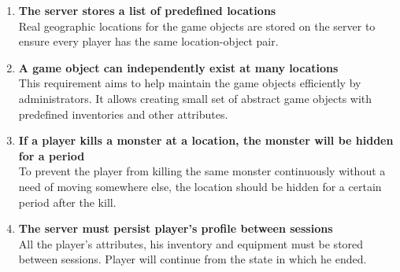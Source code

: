 \begin{enumerate}
			\item \textbf{The server stores a list of predefined locations} \\	
			Real geographic locations for the game objects are stored on the server to ensure every player has the same location-object pair. 
								
			\item \textbf{A game object can independently exist at many locations} \\
			This requirement aims to help maintain the game objects efficiently by administrators. It allows creating small set of abstract game objects with predefined inventories and other attributes. 
			
			\item \textbf{If a player kills a monster at a location, the monster will be hidden for a period} \\
			To prevent the player from killing the same monster continuously without a need of moving somewhere else, the location should be hidden for a certain period after the kill.						
					
			\item \textbf{The server must persist player’s profile between sessions} \\
			All the player's attributes, his inventory and equipment must be stored between sessions. Player will continue from the state in which he ended.
			
		\end{enumerate}
